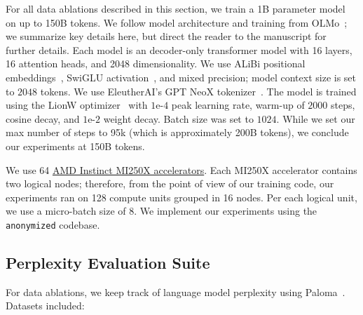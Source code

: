 \documentclass{article}
\begin{document}
For all data ablations described in this section, we train a 1B parameter model on up to 150B tokens. 
We follow model architecture and training from OLMo~\citep{olmo20247b}; we summarize key details here, but direct the reader to the manuscript for further details.
Each model is an decoder-only transformer model with 16 layers, 16 attention heads, and 2048 dimensionality. 
We use ALiBi positional embeddings~\citep{Press2021Alibi}, SwiGLU activation~\citep{Shazeer2020swiglu}, and mixed precision; model context size is set to $2048$ tokens. 
We use EleutherAI's GPT NeoX tokenizer~\citep{Black2022GPTNeoX20BAO}.
The model is trained using the LionW optimizer~\citep{Chen2023Lion} with $1\text{e-}4$ peak learning rate, warm-up of $2000$ steps, cosine decay, and $1\text{e-}2$ weight decay. 
Batch size was set to $1024$.
While we set our max number of steps to 95k (which is approximately 200B tokens), we conclude our experiments at 150B tokens.

We use 64 \href{https://www.amd.com/en/products/server-accelerators/instinct-mi250x}{AMD Instinct MI250X accelerators}. Each MI250X accelerator contains two logical nodes; therefore, from the point of view of our training code, our experiments ran on 128 compute units grouped in 16 nodes. Per each logical unit, we use a micro-batch size of 8. 
We implement our experiments using the \texttt{anonymized} codebase.

\subsection{Perplexity Evaluation Suite}
\label{sec:setup:ppl}

For data ablations, we keep track of language model perplexity using Paloma~\citep{paloma}. Datasets included:
\end{document}
